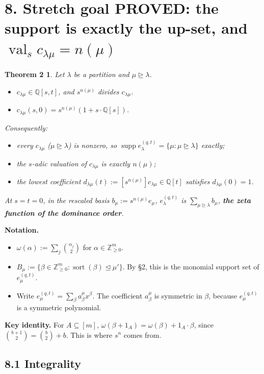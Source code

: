 \documentclass[11pt]{article}
\newtheorem*{theorem2}{Theorem 2}
\theoremstyle{definition}
\newcommand{\Q}{\mathbb{Q}}
\newcommand{\Z}{\mathbb{Z}}
\newcommand{\dom}{\trianglerighteq}
\newcommand{\domd}{\trianglelefteq}
\newcommand{\val}{\operatorname{val}}
\newcommand{\sort}{\operatorname{sort}}
\newcommand{\supp}{\operatorname{supp}}
\begin{document}
\section*{8. Stretch goal PROVED: the support is exactly the up-set, and $\val_s c_{\lambda\mu} = n(\mu)$}

\begin{theorem2}
Let $\lambda$ be a partition and $\mu \dom \lambda$.
\begin{itemize}
\item[(a)] $c_{\lambda\mu} \in \Q[s,t]$, and $s^{n(\mu)}$ divides $c_{\lambda\mu}$.
\item[(b)] $c_{\lambda\mu}(s,0) = s^{n(\mu)}(1 + s\cdot\Q[s])$.
\end{itemize}
Consequently:
\begin{itemize}
\item every $c_{\lambda\mu}$ ($\mu \dom \lambda$) is nonzero, so $\supp e_\lambda^{(q,t)} = \{\mu : \mu \dom \lambda\}$ \emph{exactly};
\item the $s$-adic valuation of $c_{\lambda\mu}$ is exactly $n(\mu)$;
\item the lowest coefficient $d_{\lambda\mu}(t) := [s^{n(\mu)}]c_{\lambda\mu} \in \Q[t]$ satisfies $d_{\lambda\mu}(0) = 1$.
\end{itemize}
At $s = t = 0$, in the rescaled basis $b_\mu := s^{n(\mu)}e_\mu$, $e_\lambda^{(q,t)}$ is $\sum_{\mu\dom\lambda} b_\mu$, \textbf{the zeta function of the dominance order}.
\end{theorem2}

\noindent\textbf{Notation.}
\begin{itemize}
\item $\omega(\alpha) := \sum_j \binom{\alpha_j}{2}$ for $\alpha \in \Z^m_{\ge0}$.
\item $B_\mu := \{\beta \in \Z^m_{\ge0} : \sort(\beta) \domd \mu'\}$. By \S2, this is the monomial support set of $e_\mu^{(q,t)}$.
\item Write $e_\mu^{(q,t)} = \sum_\beta a^\mu_\beta x^\beta$. The coefficient $a^\mu_\beta$ is symmetric in $\beta$, because $e_\mu^{(q,t)}$ is a symmetric polynomial.
\end{itemize}

\noindent\textbf{Key identity.} For $A \subseteq [m]$, $\omega(\beta + 1_A) = \omega(\beta) + 1_A\cdot\beta$, since $\binom{b+1}{2} = \binom{b}{2} + b$. This is where $s^{n}$ comes from.

\subsection*{8.1 Integrality}
\end{document}
